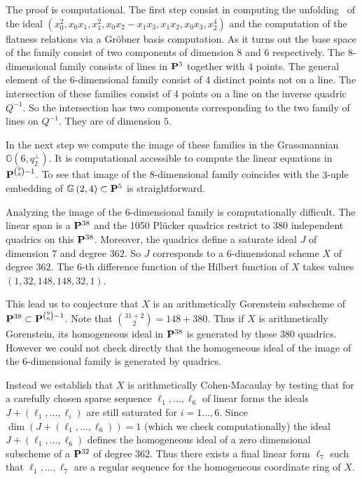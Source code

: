 \documentclass{amsart}
\newcommand{\PP}{{\bf P}}
\def\Gr #1#2{{\mathbb G}\left(#1,#2\right)} %
\begin{document}
The proof is computational.
The first step consist in computing the
unfolding~\cite{Hauser_Sings} of the ideal
$\left({x}_{0}^{2},{x}_{0}{x}_{1},{x}_{1}^{2},{x}_{0}{
     x}_{2}-{x}_{1}{x}_{3},{x}_{1}{x}_{2},{x}_{0}{x}_{3},{x
     }_{2}^{4}\right)$
and the computation of the flatness relations via a Gr\"obner basis computation. As it turns out the base space of the family
consist of two components of dimension $8$ and $6$ respectively. The $8$-dimensional family consists of lines in $\PP^3$ together with 4 points. The general element of the 6-dimensional family consist of 4 distinct points not on a line.
The intersection of these families consist of 4 points on a line on the inverse quadric $Q^{-1}$. So the intersection has two components corresponding to the two family of lines on $Q^{-1}$. They are of dimension $5$.

In the next step we compute the image of these families in the Grassmannian  $\Gr{6}{q^{\perp}_2}$. It is computational
accessible to compute the linear equations in $\PP^{\binom{9}{6}-1}$. 
To see that image of the 8-dimensional family coincides with the $3$-uple embedding of $\Gr{2}{4} \subset \PP^5$ is straightforward. 

Analyzing the image of the $6$-dimensional family is computationally difficult.  
The linear span is a $\PP^{38}$ and the 1050 Pl\"ucker quadrics restrict to $380$ independent quadrics on this $\PP^{38}$.
Moreover, the quadrics define a saturate ideal $J$ of dimension $7$ and degree $362$. So $J$ corresponds to a 6-dimensional  scheme $X$ of degree $362$. The 6-th difference function of the Hilbert function of $X$ takes values $(1,32,148,148,32,1)$.

This lead us to conjecture that $X$ is an arithmetically Gorenstein subscheme of $\PP^{38} \subset \PP^{\binom{9}{6}-1}$.
Note that $\binom{31+2}{2} = 148 +380$. Thus if $X$ is arithmetically
Gorenstein, its homogeneous ideal in $\PP^{38}$ is  generated by these 380 quadrics. However we could not check directly that the homogeneous ideal of the image of the 6-dimensional family is generated by quadrics.

Instead we establish that $X$ is arithmetically Cohen-Macaulay by testing that for a carefully chosen sparse sequence 
$\ell_1,\ldots,\ell_6$ of linear forms the ideals $J+(\ell_1,\ldots,\ell_i)$ are still saturated for $i=1 \ldots,6$.
Since $\dim (J+(\ell_1,\ldots,\ell_6))=1$ (which we check computationally) the
ideal  $J+(\ell_1,\ldots,\ell_6)$ defines the homogeneous ideal  of a zero dimensional subscheme of a $\PP^{32}$ of degree $362$. Thus there exists a final linear form $\ell_7$ such that $\ell_1,\ldots,\ell_7$ are a regular sequence for the homogeneous coordinate ring of $X$. 
\end{document}
